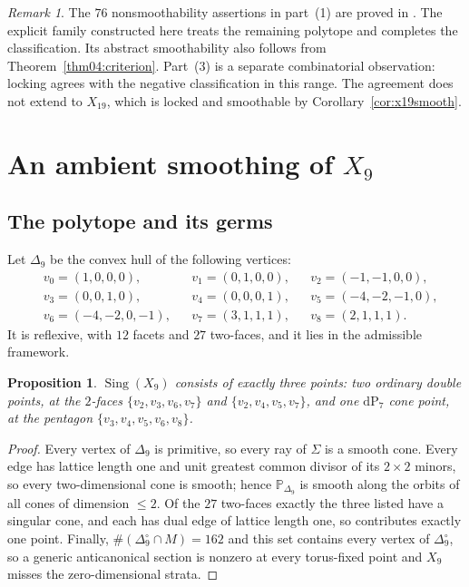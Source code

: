 \documentclass[11pt]{amsart}
\newtheorem{proposition}[theorem]{Proposition}
\theoremstyle{definition}
\theoremstyle{remark}
\newtheorem{remark}[theorem]{Remark}
\theoremstyle{plain}
\newcommand{\PP}{\mathbb{P}}
\newcommand{\Sing}{\operatorname{Sing}}
\newcommand{\dP}{\mathrm{dP}}
\begin{document}
\begin{remark}
The $76$ nonsmoothability assertions in part~(1) are proved in
\cite[Prop.~9.2]{PaperIV}.  The explicit family constructed here
treats the remaining polytope and completes the classification.
Its abstract smoothability also follows from
Theorem~\ref{thm04:criterion}.  Part~(3) is a separate combinatorial
observation: locking agrees with the negative classification in
this range.  The agreement does not extend to $X_{19}$, which is
locked and smoothable by Corollary~\ref{cor:x19smooth}.
\end{remark}

\section{An ambient smoothing of \texorpdfstring{$X_9$}{X9}}\label{sec:thmB}

\subsection{The polytope and its germs}
Let $\Delta_9$ be the convex hull of the following vertices:
\[
\begin{aligned}
&v_0 = (1,0,0,0), && v_1 = (0,1,0,0), && v_2 = (-1,-1,0,0), \\
&v_3 = (0,0,1,0), && v_4 = (0,0,0,1), && v_5 = (-4,-2,-1,0), \\
&v_6 = (-4,-2,0,-1), && v_7 = (3,1,1,1), && v_8 = (2,1,1,1).
\end{aligned}
\]
It is reflexive, with $12$ facets and $27$ two-faces, and it lies in the
admissible framework.

\begin{proposition}\label{prop:sing9}
$\Sing(X_9)$ consists of exactly three points: two ordinary double points, at
the $2$-faces $\{v_2,v_3,v_6,v_7\}$ and $\{v_2,v_4,v_5,v_7\}$, and one $\dP_7$
cone point, at the pentagon $\{v_3,v_4,v_5,v_6,v_8\}$.
\end{proposition}

\begin{proof}
Every vertex of $\Delta_9$ is primitive, so every ray of $\Sigma$ is a smooth
cone.  Every edge has lattice length one and unit greatest common divisor of
its $2 \times 2$ minors, so every two-dimensional cone is smooth; hence
$\PP_{\Delta_9}$ is smooth along the orbits of all cones of dimension $\le 2$.
Of the $27$ two-faces exactly the three listed have a singular cone, and each
has dual edge of lattice length one, so contributes exactly one point.
Finally, $\#(\Delta_9^\circ \cap M) = 162$ and this set contains every vertex of
$\Delta_9^\circ$, so a generic anticanonical section is nonzero at every
torus-fixed point and $X_9$ misses the zero-dimensional strata.
\end{proof}
\end{document}
